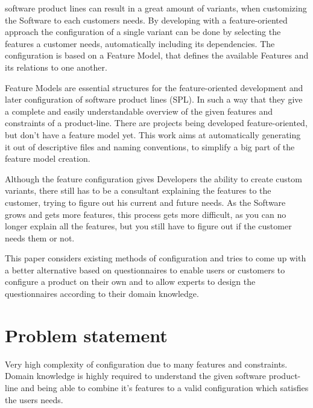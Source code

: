 % 
% 
% 
% 
 software product lines can result in a great amount of variants, when customizing the Software to each customers needs. By developing with a feature-oriented approach the configuration of a single variant can be done by selecting the features a customer needs, automatically including its dependencies. The configuration is based on a Feature Model, that defines the available Features and its relations to one another.

Feature Models are essential structures for the feature-oriented development and later configuration of software product lines (SPL). In such a way that they give a complete and easily understandable overview of the given features and constraints of a product-line. There are projects being developed feature-oriented, but don't have a feature model yet. This work aims at automatically generating it out of descriptive files and naming conventions, to simplify a big part of the feature model creation.

Although the feature configuration gives  Developers the ability to create custom variants, there still has to be a consultant explaining the features to the customer, trying to figure out his current and future needs. As the Software grows and gets more features, this process gets more difficult, as you can no longer explain all the features, but you still have to figure out if the customer needs them or not.

This paper considers existing methods of configuration and tries to come up with a better alternative based on questionnaires to enable users or customers to configure a product on their own and to allow experts to design the questionnaires according to their domain knowledge.

\section*{Problem statement}
Very high complexity of configuration due to many features and constraints. Domain knowledge is highly required to understand the given software product-line and being able to combine it's features to a valid configuration which satisfies the users needs.

